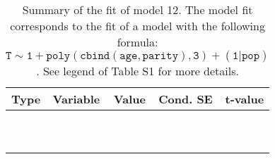 \begin{table}

\caption{\label{tab:tab12}Summary of the fit of model 12. The model fit corresponds to the fit of a model with the following formula: {\small$\mathtt{T \sim 1 + poly(cbind(age, parity), 3) + (1 | pop)}$}. See legend of Table S1 for more details.}
\centering
\fontsize{8}{10}\selectfont
\begin{tabular}[t]{>{\raggedright\arraybackslash}p{3cm}>{\raggedright\arraybackslash}p{5cm}rrr}
\toprule
Type & Variable & Value & Cond. SE & t-value\\
\midrule
\cellcolor{gray!6}{fixed effects} & \cellcolor{gray!6}{$\beta_1$} & \cellcolor{gray!6}{-4.08} & \cellcolor{gray!6}{0.111} & \cellcolor{gray!6}{-36.8}\\
\cellcolor{gray!6}{} & \cellcolor{gray!6}{$\beta_{\mathtt{age}}$} & \cellcolor{gray!6}{71} & \cellcolor{gray!6}{30.7} & \cellcolor{gray!6}{2.32}\\
\cellcolor{gray!6}{} & \cellcolor{gray!6}{$\beta_{\mathtt{age}^2}$} & \cellcolor{gray!6}{-60.7} & \cellcolor{gray!6}{17} & \cellcolor{gray!6}{-3.57}\\
\cellcolor{gray!6}{} & \cellcolor{gray!6}{$\beta_{\mathtt{age}^3}$} & \cellcolor{gray!6}{-47.2} & \cellcolor{gray!6}{16.3} & \cellcolor{gray!6}{-2.9}\\
\cellcolor{gray!6}{} & \cellcolor{gray!6}{$\beta_{\mathtt{parity}}$} & \cellcolor{gray!6}{1.54} & \cellcolor{gray!6}{39.4} & \cellcolor{gray!6}{0.0392}\\
\cellcolor{gray!6}{} & \cellcolor{gray!6}{$\beta_{\mathtt{age}\times\mathtt{parity}}$} & \cellcolor{gray!6}{-4468} & \cellcolor{gray!6}{11667} & \cellcolor{gray!6}{-0.383}\\
\cellcolor{gray!6}{} & \cellcolor{gray!6}{$\beta_{\mathtt{age}^2\times\mathtt{parity}}$} & \cellcolor{gray!6}{7856} & \cellcolor{gray!6}{8568} & \cellcolor{gray!6}{0.917}\\
\cellcolor{gray!6}{} & \cellcolor{gray!6}{$\beta_{\mathtt{parity}^2}$} & \cellcolor{gray!6}{19.3} & \cellcolor{gray!6}{26.7} & \cellcolor{gray!6}{0.721}\\
\cellcolor{gray!6}{} & \cellcolor{gray!6}{$\beta_{\mathtt{age}\times\mathtt{parity}^2}$} & \cellcolor{gray!6}{-4441} & \cellcolor{gray!6}{7983} & \cellcolor{gray!6}{-0.556}\\
\cellcolor{gray!6}{} & \cellcolor{gray!6}{$\beta_{\mathtt{parity}^3}$} & \cellcolor{gray!6}{-18.8} & \cellcolor{gray!6}{13.9} & \cellcolor{gray!6}{-1.35}\\

\end{tabular}
\end{table}
